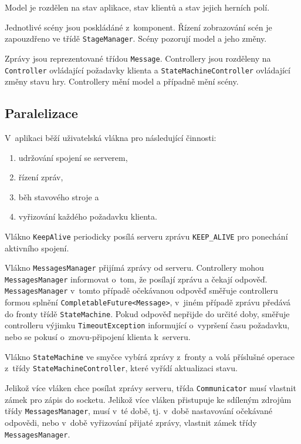 \documentclass[a4paper, 12pt]{report}
\begin{document}
Model je rozdělen na stav aplikace, stav klientů a stav jejich herních polí.

Jednotlivé scény jsou poskládáné z~komponent. Řízení zobrazování scén je zapouzdřeno ve třídě \texttt{StageManager}. Scény pozorují model a jeho změny.

Zprávy jsou reprezentované třídou \texttt{Message}. Controllery jsou rozděleny na \texttt{Controller} ovládající požadavky klienta a \texttt{StateMachineController} ovládající změny stavu hry. Controllery mění model a případně mění scény.

\subsection{Paralelizace}

V~aplikaci běží uživatelská vlákna pro následující činnosti:

\begin{enumerate}
    \item udržování spojení se serverem,
    \item řízení zpráv,
    \item běh stavového stroje a
    \item vyřizování každého požadavku klienta.
\end{enumerate}

Vlákno \texttt{KeepAlive} periodicky posílá serveru zprávu \texttt{KEEP\_ALIVE} pro ponechání aktivního spojení.

Vlákno \texttt{MessagesManager} přijímá zprávy od serveru. Controllery mohou \texttt{MessagesManager} informovat o~tom, že posílají zprávu a čekají odpověď. \texttt{MessagesManager} v~tomto případě očekávanou odpověď směřuje controlleru formou splnění \texttt{CompletableFuture<Message>}, v~jiném případě zprávu předává do fronty třídě \texttt{StateMachine}. Pokud odpověď nepřijde do určité doby, směřuje controlleru výjimku \texttt{TimeoutException} informující o~vypršení času požadavku, nebo se pokusí o~znovu-připojení klienta k~serveru.

Vlákno \texttt{StateMachine} ve smyčce vybírá zprávy z~fronty a volá příslušné operace z~třídy \texttt{StateMachineController}, které vyřídí aktualizaci stavu.

Jelikož více vláken chce posílat zprávy serveru, třída \texttt{Communicator} musí vlastnit zámek pro zápis do socketu. Jelikož více vláken přistupuje ke sdíleným zdrojům třídy \texttt{MessagesManager}, musí v~té době, tj. v~době nastavování očekávané odpovědi, nebo v~době vyřizování přijaté zprávy, vlastnit zámek třídy \texttt{MessagesManager}.
\end{document}
